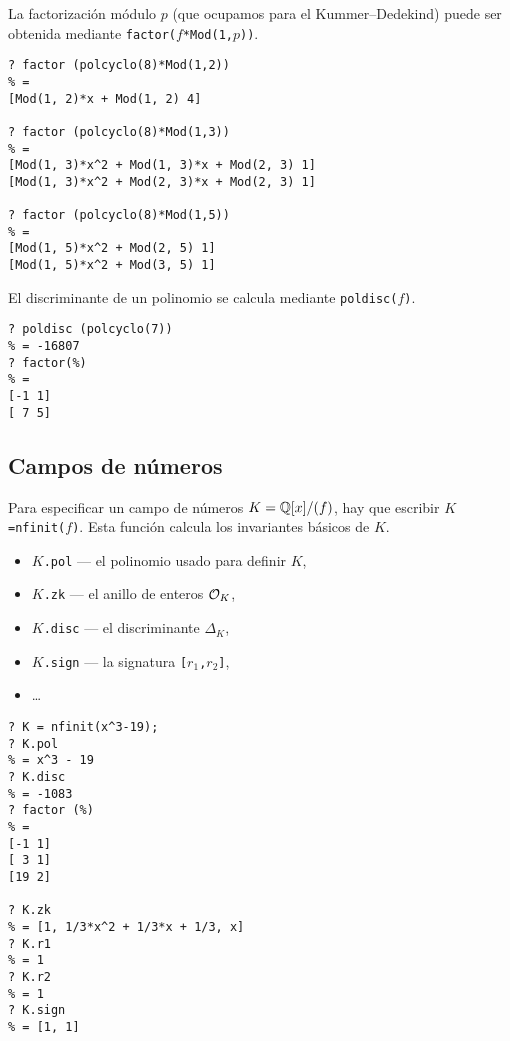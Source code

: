 La factorización módulo $p$ (que ocupamos para el Kummer--Dedekind) puede ser
obtenida mediante \texttt{factor($f$*Mod(1,$p$))}.

\begin{shaded}
\begin{verbatim}
? factor (polcyclo(8)*Mod(1,2))
% = 
[Mod(1, 2)*x + Mod(1, 2) 4]

? factor (polcyclo(8)*Mod(1,3))
% = 
[Mod(1, 3)*x^2 + Mod(1, 3)*x + Mod(2, 3) 1]
[Mod(1, 3)*x^2 + Mod(2, 3)*x + Mod(2, 3) 1]

? factor (polcyclo(8)*Mod(1,5))
% = 
[Mod(1, 5)*x^2 + Mod(2, 5) 1]
[Mod(1, 5)*x^2 + Mod(3, 5) 1]
\end{verbatim}
\end{shaded}

El discriminante de un polinomio se calcula mediante \texttt{poldisc($f$)}.

\begin{shaded}
\begin{verbatim}
? poldisc (polcyclo(7))
% = -16807
? factor(%)
% = 
[-1 1]
[ 7 5]
\end{verbatim}
\end{shaded}

\subsection{Campos de números}

Para especificar un campo de números $K = \mathbb{Q}[x]/(f)$, hay que escribir
\texttt{$K$=nfinit($f$)}. Esta función calcula los invariantes básicos de $K$.
\begin{itemize}
\item \texttt{$K$.pol} --- el polinomio usado para definir $K$,
\item \texttt{$K$.zk} --- el anillo de enteros $\mathcal{O}_K$,
\item \texttt{$K$.disc} --- el discriminante $\Delta_K$,
\item \texttt{$K$.sign} --- la signatura \texttt{[$r_1$,$r_2$]},
\item \dots
\end{itemize}

\begin{shaded}
\begin{verbatim}
? K = nfinit(x^3-19);
? K.pol
% = x^3 - 19
? K.disc 
% = -1083
? factor (%)
% = 
[-1 1]
[ 3 1]
[19 2]

? K.zk
% = [1, 1/3*x^2 + 1/3*x + 1/3, x]
? K.r1
% = 1
? K.r2
% = 1
? K.sign
% = [1, 1]
\end{verbatim}
\end{shaded}

